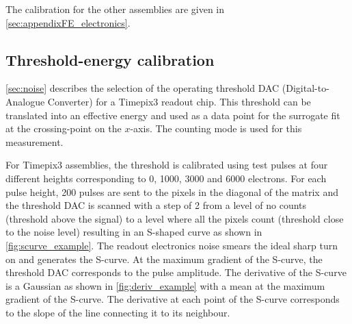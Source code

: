 The calibration for the other assemblies are given in
\cref{sec:appendixFE_electronics}.


\subsection{Threshold-energy calibration} 
\label{sec:thresholdCalibration}

\cref{sec:noise} describes the selection of the operating threshold
DAC (Digital-to-Analogue Converter) for a Timepix3 readout chip. This
threshold can be translated into an effective energy and used as a
data point for the surrogate fit at the crossing-point on the
$x$-axis. The counting mode is used for this measurement.

For Timepix3 assemblies, the threshold is calibrated using test pulses
at four different heights corresponding to 0, 1000, 3000 and 6000
electrons. For each pulse height, 200 pulses are sent to the pixels in
the diagonal of the matrix and the threshold DAC is scanned with a
step of 2 from a level of no counts (threshold above the signal) to a
level where all the pixels count (threshold close to the noise level)
resulting in an S-shaped curve as shown in
\cref{fig:scurve_example}. The readout electronics noise smears the
ideal sharp turn on and generates the S-curve. At the maximum gradient
of the S-curve, the threshold DAC corresponds to the pulse
amplitude. The derivative of the S-curve is a Gaussian as shown in
\cref{fig:deriv_example} with a mean at the maximum gradient of the
S-curve. The derivative at each point of the S-curve corresponds to
the slope of the line connecting it to its neighbour.

